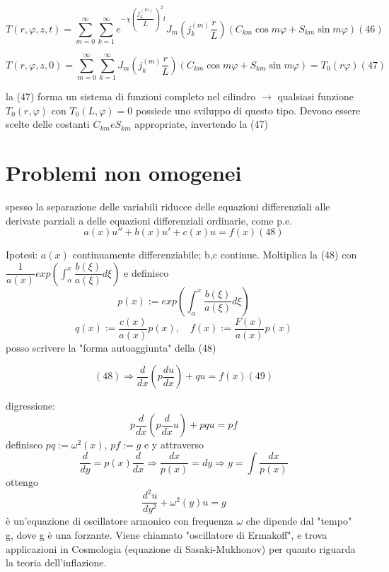 \documentclass[a4paper,11pt]{report}
\begin{document}
\begin{equation}
T(r,\varphi,z,t)=\sum_{m=0}^{\infty}\sum_{k=1}^\infty e^{-\chi\left(\dfrac{j_k^{(m)}}{L}\right)^2t}J_m\left(j_k^{(m)}\dfrac{r}{L}\right)(C_{km}\cos m\varphi + S_{km}\sin m\varphi) (46)
\end{equation}

\begin{equation}
T(r,\varphi,z,0)=\sum_{m=0}^{\infty}\sum_{k=1}^\infty J_m\left(j_k^{(m)}\dfrac{r}{L}\right)(C_{km}\cos m\varphi + S_{km}\sin m\varphi)=T_0(r\varphi) (47)
\end{equation}

la (47) forma un sistema di funzioni completo nel cilindro $\rightarrow$ qualsiasi funzione $T_0(r,\varphi)$ con $T_0(L,\varphi)=0$ possiede uno sviluppo di questo tipo. Devono essere scelte delle costanti $C_{km} e S_{km}$ appropriate, invertendo la (47) 

\section{Problemi non omogenei}
spesso la separazione delle variabili riducce delle equazioni differenziali alle derivate parziali a delle equazioni differenziali ordinarie, come p.e.
\begin{equation}
a(x)u'' + b(x)u'+c(x)u=f(x) (48)
\end{equation}

Ipotesi: $a(x)$ continuamente differenziabile; b,c continue. Moltiplica la (48) con $\dfrac{1}{a(x)}exp\left(\int_\alpha^x\dfrac{b(\xi)}{a(\xi)}d\xi\right)$ e definisco
$$
p(x):= exp\left(\int_\alpha^x \dfrac{b(\xi)}{a(\xi)}d\xi\right)
$$
$$
q(x):=\dfrac{c(x)}{a(x)}p(x),\quad f(x):=\dfrac{F(x)}{a(x)}p(x)
$$
posso scrivere la "forma autoaggiunta" della (48)

\begin{equation}
(48)\Rightarrow \dfrac{d}{dx}\left(p\dfrac{du}{dx}\right) + qu = f(x) (49)
\end{equation}

digressione:\\
$$
p\dfrac{d}{dx} \left( p\dfrac{d}{dx}u\right)+pqu=pf
$$
definisco $pq:=\omega^2(x)$, $pf:=g$ e y attraverso 
$$
\dfrac{d}{dy}=p(x)\dfrac{d}{dx} \Rightarrow \dfrac{dx}{p(x)}=dy \Rightarrow y=\int \dfrac{dx}{p(x)} 
$$ 
ottengo
$$
\dfrac{d^2u}{dy^2}+\omega^2(y)u=g
$$
è un'equazione di oscillatore armonico con frequenza $\omega$ che dipende dal "tempo" g, dove g è una forzante. Viene chiamato "oscillatore di Ermakoff", e trova applicazioni in Cosmologia (equazione di Sasaki-Mukhonov) per quanto riguarda la teoria dell'inflazione.\\
\end{document}
